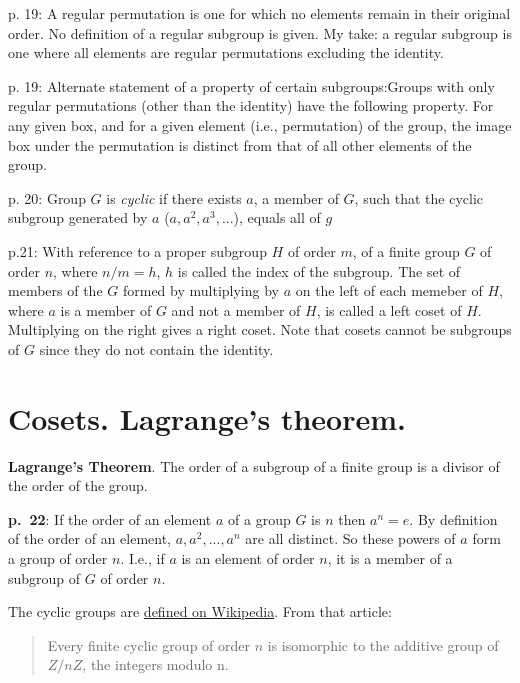 \documentclass{book}
\begin{document}
p. 19: A regular permutation is one for which no elements remain in
their original order. No definition of a regular subgroup is given. My
take: a regular subgroup is one where all elements are regular
permutations excluding the identity.

p. 19: Alternate statement of a property of certain
subgroups:\hfil\break Groups with only regular permutations (other
than the identity) have the following property. For any given box,
and for a given element (i.e., permutation) of the group, the image
box under the permutation is distinct from that of all other elements
of the group.

p. 20: Group $G$ is {\it cyclic} if there exists $a$, a member of $G$,
such that the cyclic subgroup generated by $a$ ($a,a^2,a^3,...$),
equals all of $g$

p.21: With reference to a proper subgroup $H$ of order $m$, of a
finite group $G$ of order $n$, where $n/m = h$, $h$ is called the
index of the subgroup. The set of members of the $G$ formed by
multiplying by $a$ on the left of each memeber of $H$, where $a$ is a
member of $G$ and not a member of $H$, is called a left coset of
$H$. Multiplying on the right gives a right coset. Note that cosets
cannot be subgroups of $G$ since they do not contain the identity.

\section{Cosets. Lagrange's theorem.}

{\bf Lagrange's Theorem}. The order of a subgroup of a finite group is
a divisor of the order of the group.

{\bf p.\ 22}: If the order of an element $a$ of a group $G$ is $n$
then $a^n = e$. By definition of the order of an element,
$a,a^2,...,a^n$ are all distinct. So these powers of $a$ form a group
of order $n$. I.e., if $a$ is an element of order $n$, it is a member
of a subgroup of $G$ of order $n$.

The cyclic groups are \href{https://en.wikipedia.org/wiki/Cyclic_group}{defined on Wikipedia}. From that article:

\begin{quote}
Every finite cyclic group of order $n$ is isomorphic to the additive group of $Z/nZ$, the integers modulo n.
\end{quote}

\end{document}
